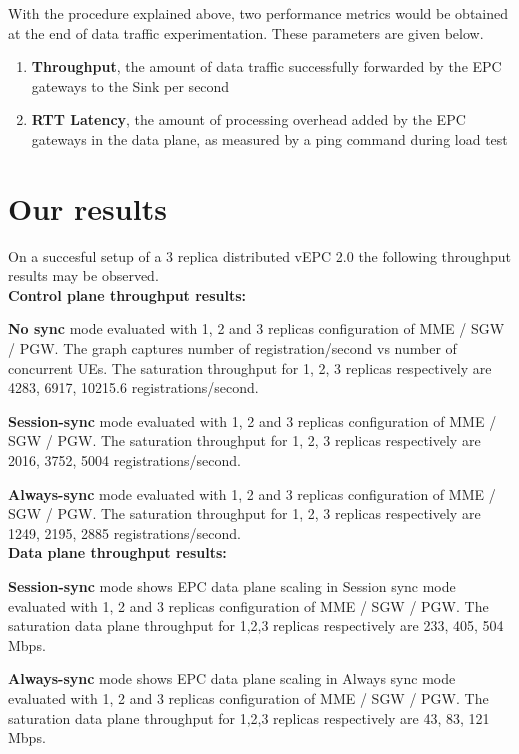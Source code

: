 \pdfminorversion=4\documentclass[hidelinks]{report}
\begin{document}
With the procedure explained above, two performance metrics would be obtained at the end of data traffic experimentation. These parameters are given below.

\begin{enumerate}

\item \textbf{Throughput}, the amount of data traffic successfully forwarded by the EPC gateways to the Sink per second

\item \textbf{RTT Latency}, the amount of processing overhead added by the EPC gateways in the data
plane, as measured by a ping command during load test

\end{enumerate}

\section*{Our results}
On a succesful setup of a 3 replica distributed vEPC 2.0 the following throughput results may be observed.\\

\noindent\textbf{Control plane throughput results:}

 \textbf{No sync} mode evaluated with 1, 2 and 3 replicas configuration of MME / SGW / PGW.
The graph captures number of registration/second vs number of concurrent UEs. The saturation throughput for 1, 2, 3 replicas respectively are 4283, 6917, 10215.6 registrations/second.

\textbf{Session-sync} mode evaluated with 1, 2 and 3 replicas configuration of MME / SGW / PGW.
The saturation throughput for 1, 2, 3 replicas respectively are 2016, 3752, 5004 registrations/second.

\textbf{Always-sync} mode evaluated with 1, 2 and 3 replicas configuration of MME / SGW / PGW.
The saturation throughput for 1, 2, 3 replicas respectively are 1249, 2195, 2885 registrations/second.\\

\noindent\textbf{Data plane throughput results:}

\textbf{Session-sync} mode shows EPC data plane scaling in Session sync mode evaluated with 1, 2 and 3 replicas configuration of MME / SGW / PGW. The saturation data plane throughput for 1,2,3 replicas respectively are 233, 405, 504 Mbps.

\textbf{Always-sync} mode shows EPC data plane scaling in Always sync mode evaluated with 1, 2 and 3 replicas configuration of MME / SGW / PGW. The saturation data plane throughput for 1,2,3 replicas respectively are 43, 83, 121 Mbps.\\
\end{document}

